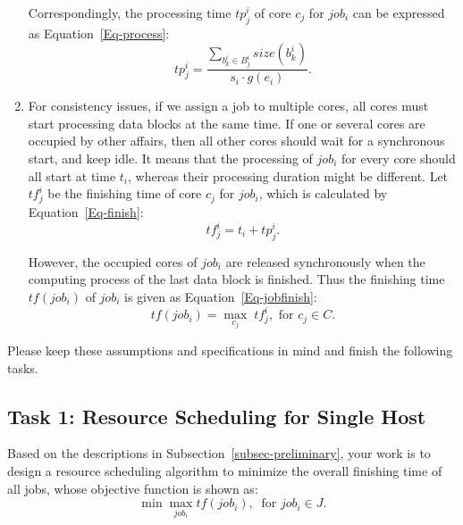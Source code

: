 \documentclass{llncs}
\begin{document}
\begin{enumerate}
  \qquad Correspondingly, the processing time $tp^i_{j}$ of core $c_j$ for $job_i$ can be expressed as Equation~\eqref{Eq-process}:
  \begin{equation} \label{Eq-process}
  tp^i_{j} = \frac{\sum_{b^i_{k} \in B^i_{j}}size(b^i_{k})}{s_i \cdot g(e_i)}.
  \end{equation} 
  
  \vspace{2mm}

  \item For consistency issues, if we assign a job to multiple cores, all cores must start processing data blocks at the same time. If one or several cores are occupied by other affairs, then all other cores should wait for a synchronous start, and keep idle. It means that the processing of $job_i$ for every core should all start at time $t_i$, whereas their processing duration might be different. Let $tf^i_{j}$ be the finishing time of core $c_j$ for $job_i$, which is calculated by Equation~\eqref{Eq-finish}:
  \begin{equation} \label{Eq-finish}
  tf^i_{j} = t_i + tp^i_{j}.
  \end{equation}   
  
  However, the occupied cores of $job_i$ are released synchronously when the computing process of the last data block is finished. Thus the finishing time $tf(job_i)$ of $job_i$ is given as Equation~\eqref{Eq-jobfinish}:
  \begin{equation} \label{Eq-jobfinish}
  tf(job_i) = \max_{c_j} \; tf^i_{j}, \text{ for } c_j \in C.
  \end{equation} 
\end{enumerate}


Please keep these assumptions and specifications in mind and finish the following tasks.


\subsection{Task 1: Resource Scheduling for Single Host} \label{subsec-single}

Based on the descriptions in Subsection~\ref{subsec-preliminary}, your work is to design a resource scheduling algorithm to minimize the overall finishing time of all jobs, whose objective function is shown as:
  \begin{equation*}
  \min \max_{job_i} tf(job_i), \ \text{ for } job_i \in J. 
  \end{equation*}  
\end{document}
